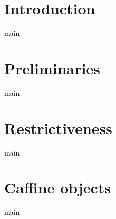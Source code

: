 



\section{Introduction}
{main}

\section{Preliminaries}
{main}

\section{Restrictiveness}
{main}

\section{Caffine objects}
{main}


